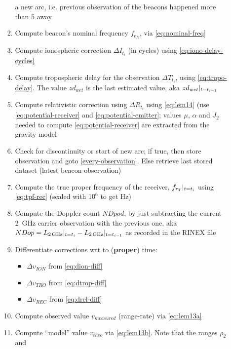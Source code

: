 \begin{enumerate}
\begin{enumerate}
\begin{enumerate}
              a new arc, i.e. previous observation of the beacons happened more than 
              \SI{5}{\min} away
            \item Compute beacon's nominal frequency $f_{e_N}$, via \ref{eq:nominal-freq} 
            \item Compute ionospheric correction $\Delta I_{t_i}$ (in cycles) using \ref{eq:iono-delay-cycles}
            \item Compute tropospheric delay for the observation $\Delta T_{t_i}$, 
              using \ref{eq:tropo-delay}. The value $zd_{wet}$ is the last estimated 
              value, aka $zd_{wet}|_{t=t_{i-1}}$
            \item Compute relativistic correction using $\Delta R_{t_i}$ using \ref{eq:lem14}
              (use \ref{eq:potential-receiver} and \ref{eq:potential-emitter}; values 
              $\mu$, $\alpha$ and $J_2$ needed to compute \ref{eq:potential-receiver} 
              are extracted from the gravity model
            \item Check for discontinuity or start of new arc; if true, then store 
              observation and goto \ref{every-observation}. Else retrieve last 
              stored dataset (latest beacon observation)
            \item Compute the true proper frequency of the receiver, $f_{r_T}|_{t=t_i}$ 
              using \ref{eq:tpf-rec} (scaled with $10^6$ to get \si{\Hz})
            \item Compute the Doppler count $NDpod$, by just subtracting the current 
              \SI{2}{\GHz} carrier observation with the previous one, aka
              $NDop = L_{\SI{2}{\GHz}}\at{t=t_i} - L_{\SI{2}{\GHz}}\at{t=t_{i-1}}$
              as recorded in the RINEX file
            \item Differentiate corrections wrt to (\textbf{proper}) time:
              \begin{itemize}
                \item $\Delta v_{ION}$ from \ref{eq:dion-diff}
                \item $\Delta v_{TRO}$ from \ref{eq:dtrop-diff}
                \item $\Delta v_{REC}$ from \ref{eq:drel-diff}
              \end{itemize}
            \item Compute observed value $v_{measured}$ (range-rate) via \ref{eq:lem13a}
            \item Compute ``model'' value $v_{theo}$ via \ref{eq:lem13b}. Note that the ranges $\rho _2$ and 

\end{enumerate}
\end{enumerate}
\end{enumerate}
